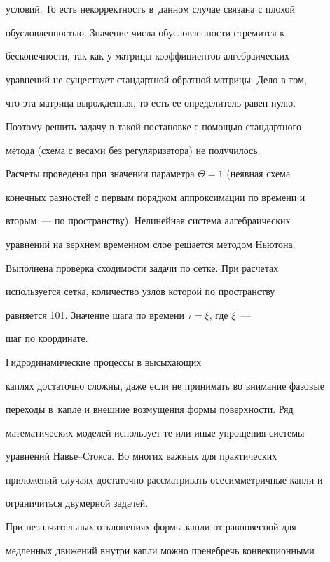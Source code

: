 условий. То есть некорректность в~данном случае связана с плохой

обусловленностью. Значение числа обусловленности стремится к

бесконечности, так как у матрицы коэффициентов алгебраических

уравнений не существует стандартной обратной матрицы. Дело в том,

что эта матрица вырожденная, то есть ее определитель равен нулю.

Поэтому решить задачу в такой постановке с помощью стандартного

метода (схема с весами без регуляризатора) не получилось.



Расчеты проведены при значении параметра $\Theta = 1$ (неявная схема

конечных разностей с первым порядком аппроксимации по времени и

вторым~--- по пространству). Нелинейная система алгебраических

уравнений на верхнем временном слое решается методом Ньютона.

Выполнена проверка сходимости задачи по сетке. При расчетах

используется сетка, количество узлов которой по пространству

равняется 101. Значение шага по времени $\tau = \xi$, где $\xi$~---

шаг по координате.



\smallskip



 Гидродинамические процессы в высыхающих

каплях достаточно сложны, даже если не принимать во внимание фазовые

переходы в~капле и внешние возмущения формы поверхности. Ряд

математических моделей использует те или иные упрощения системы

уравнений Навье--Стокса. Во многих важных для практических

приложений случаях достаточно рассматривать осесимметричные капли и

ограничиться двумерной задачей.



При незначительных отклонениях формы капли от равновесной для

медленных движений внутри капли можно пренебречь конвекционными

